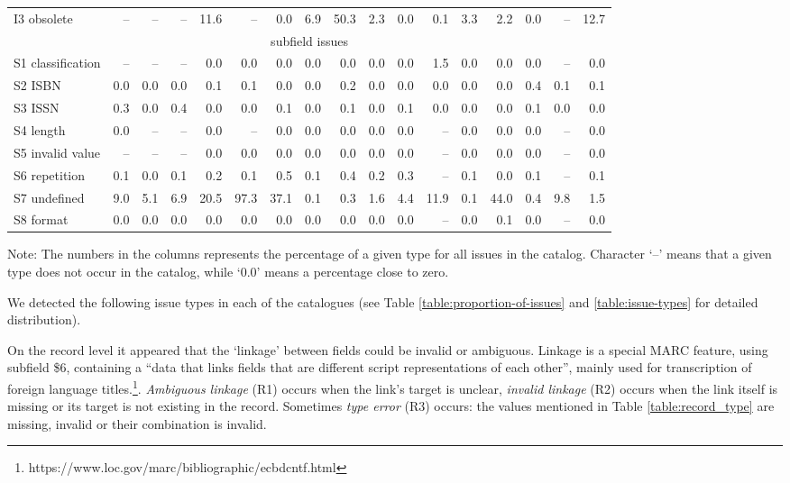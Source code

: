 {\begin{landscape}
\begin{table}
\begin{minipage}{\columnwidth}
\begin{center}
\begin{tabular}{lrrrrrrrrrrrrrrrr}
I3 obsolete & -- & -- & -- & 11.6 & -- & 0.0 & 6.9 & 50.3 & 2.3 & 0.0 & 0.1 & 3.3 & 2.2 & 0.0 & -- & 12.7 \\
\multicolumn{17}{c}{subfield issues} \\
S1 classification & -- & -- & -- & 0.0 & 0.0 & 0.0 & 0.0 & 0.0 & 0.0 & 0.0 & 1.5 & 0.0 & 0.0 & 0.0 & -- & 0.0 \\
S2 ISBN & 0.0 & 0.0 & 0.0 & 0.1 & 0.1 & 0.0 & 0.0 & 0.2 & 0.0 & 0.0 & 0.0 & 0.0 & 0.0 & 0.4 & 0.1 & 0.1 \\
S3 ISSN & 0.3 & 0.0 & 0.4 & 0.0 & 0.0 & 0.1 & 0.0 & 0.1 & 0.0 & 0.1 & 0.0 & 0.0 & 0.0 & 0.1 & 0.0 & 0.0 \\
S4 length & 0.0 & -- & -- & 0.0 & -- & 0.0 & 0.0 & 0.0 & 0.0 & 0.0 & -- & 0.0 & 0.0 & 0.0 & -- & 0.0 \\
S5 invalid value & -- & -- & -- & 0.0 & 0.0 & 0.0 & 0.0 & 0.0 & 0.0 & 0.0 & -- & 0.0 & 0.0 & 0.0 & -- & 0.0 \\
S6 repetition & 0.1 & 0.0 & 0.1 & 0.2 & 0.1 & 0.5 & 0.1 & 0.4 & 0.2 & 0.3 & -- & 0.1 & 0.0 & 0.1 & -- & 0.1 \\
S7 undefined & 9.0 & 5.1 & 6.9 & 20.5 & 97.3 & 37.1 & 0.1 & 0.3 & 1.6 & 4.4 & 11.9 & 0.1 & 44.0 & 0.4 & 9.8 & 1.5 \\
S8 format & 0.0 & 0.0 & 0.0 & 0.0 & 0.0 & 0.0 & 0.0 & 0.0 & 0.0 & 0.0 & -- & 0.0 & 0.1 & 0.0 & -- & 0.0 \\
\bottomrule
\end{tabular}
\end{center}
\footnotesize
Note: The numbers in the columns represents the percentage of a given type for all issues in the catalog. Character `--' means that a given type does not occur in the catalog, while `0.0' means a percentage close to zero.
\end{minipage}
\end{table}
    \end{landscape}
    \clearpage%
}

We detected the following issue types in each of the catalogues (see Table \ref{table:proportion-of-issues} and \ref{table:issue-types} for detailed distribution).

On the record level it appeared that the `linkage' between fields could be invalid or ambiguous. Linkage is a special MARC feature, using subfield \$6, containing  a ``data that links fields that are different script representations of each other'', mainly used for transcription of foreign language titles.\footnote{https://www.loc.gov/marc/bibliographic/ecbdcntf.html}. \emph{Ambiguous linkage} (R1) occurs when the link's target is unclear, \emph{invalid linkage} (R2) occurs when the link itself is missing or its target is not existing in the record. Sometimes \emph{type error} (R3) occurs: the values mentioned in Table \ref{table:record_type} are missing, invalid or their combination is invalid.

